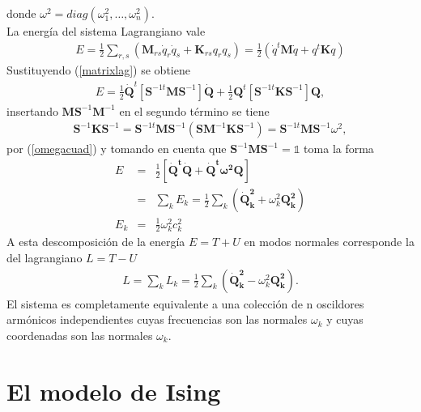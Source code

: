 \documentclass[letterpaper,12pt,oneside]{book}
\begin{document}
%
donde $\omega^2=diag(\omega_1^2,\dots,\omega_n^2)$.\\
La energ\'ia del sistema Lagrangiano vale
%
\begin{eqnarray}
E=\frac{1}{2}\sum_{r,s}\left(\textbf{M}_{rs}\dot q_r \dot q_s + \textbf{K}_{rs}q_r q_s \right) = \frac{1}{2}\left(\dot q^t \textbf{M}\dot q + q^t\textbf{K}q \right)
\end{eqnarray}
%
Sustituyendo (\ref{matrixlag}) se obtiene 
%
\begin{eqnarray}
E=\frac{1}{2} \boldsymbol{\dot Q}^t\left[\textbf{S}^{-1t}\textbf{M}\textbf{S}^{-1} \right] \boldsymbol{\dot Q}+\frac{1}{2} \textbf{Q}^t \left[\textbf{S}^{-1t}\textbf{K}\textbf{S}^{-1} \right]\textbf{Q},
\end{eqnarray}
%
insertando $\textbf{M}\textbf{S}^{-1}\textbf{M}^{-1}$ en el segundo t\'ermino se tiene 
%
\begin{eqnarray}
\textbf{S}^{-1}\textbf{K}\textbf{S}^{-1}=\textbf{S}^{-1t}\textbf{M}\textbf{S}^{-1}\left(\textbf{S}\textbf{M}^{-1}\textbf{K}\textbf{S}^{-1}\right)=\textbf{S}^{-1t}\textbf{M}\textbf{S}^{-1}\omega^2,
\end{eqnarray}
%
por (\ref{omegacuad}) y tomando en cuenta que $\boldsymbol{S}^{-1}\textbf{M}\textbf{S}^{-1}=\mathbb{1}$ toma la forma
%
\begin{eqnarray}
E&=&\frac{1}{2} \left[ \boldsymbol{\dot Q^t} \boldsymbol{\dot Q}+\boldsymbol{ \dot Q^t} \boldsymbol{\omega^2} \boldsymbol{Q} \right]\nonumber\\
&=&\sum_{k}E_k=\frac{1}{2}\sum_{k}(\boldsymbol{\dot Q_k^2}+\omega^2_k\boldsymbol{Q_k^2})\nonumber\\
E_k&=&\frac{1}{2}\omega_k^2c_k^2
\end{eqnarray}
%
A esta descomposici\'on de la energ\'ia $E=T+U$ en modos normales corresponde la del lagrangiano $L=T-U$
%
\begin{eqnarray}
L=\sum_k L_k = \frac{1}{2}\sum_k\left( \boldsymbol{\dot Q_k^2} - \omega_k^2 \boldsymbol{Q_k^2} \right).
\end{eqnarray}
El sistema es completamente equivalente a una colecci\'on de n oscildores arm\'onicos independientes cuyas frecuencias son las normales $\omega_k$ y cuyas coordenadas son las normales $\omega_k$.
%

\chapter{El modelo de Ising}
\end{document}
